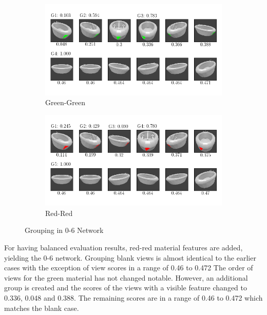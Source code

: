 \begin{figure}
	\centering
	\begin{subfigure}{\textwidth}
		\includegraphics[trim=10 20 10 20, clip]{images/mn-sl-0-6-20/bathtub_0107_4_grouping.png}
		\caption{Green-Green}
		\label{fig:grouping-0-6-green-green}
	\end{subfigure}
	\begin{subfigure}{\textwidth}
		\includegraphics[trim=10 20 10 20, clip]{images/mn-sl-0-6-20/bathtub_0107_5_grouping.png}
		\caption{Red-Red}
		\label{fig:grouping-0-6-red-red}
	\end{subfigure}
	\caption[Grouping in 0-6 Network]{Grouping in 0-6 Network}
	\label{fig:grouping-0-6}
\end{figure}
For having balanced evaluation results, red-red material features are added, yielding the 0-6 network.
Grouping blank views is almost identical to the earlier cases with the exception of view scores in a range of 0.46 to 0.472
The order of views for the green material has not changed notable.
However, an additional group is created and the scores of the views with a visible feature changed to 0.336, 0.048 and 0.388.
The remaining scores are in a range of 0.46 to 0.472 which matches the blank case.
